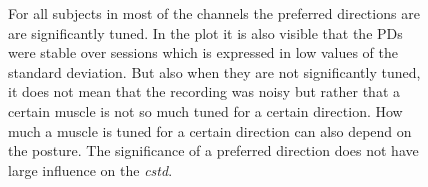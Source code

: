 \begin{figure}[ht]
    \centering
    \caption{For all subjects in most of the channels the preferred directions are are significantly tuned. In the plot it is also visible that the PDs were stable over sessions which is expressed in low values of the standard deviation. But also when they are not significantly tuned, it does not mean that the recording was noisy but rather that a certain muscle is not so much tuned for a certain direction. How much a muscle is tuned for a certain direction can also depend on the posture. The significance of a preferred direction does not have large influence on the \emph{cstd}.}
    \label{sg:fig:pd_barplots}
\end{figure}

